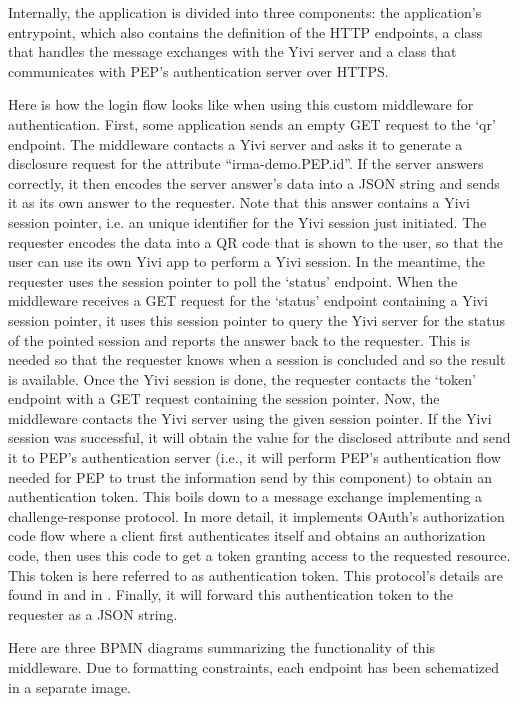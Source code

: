 \documentclass{report}
\begin{document}
Internally, the application is divided into three components: the application's entrypoint, which also contains the definition of the HTTP endpoints, a class that handles the
message exchanges with the Yivi server and a class that communicates with PEP's authentication server over HTTPS. \par
Here is how the login flow looks like when using this custom middleware for authentication. First, some application sends an empty GET request to the \enquote*{qr} endpoint. The
middleware contacts a Yivi server and asks it to generate a disclosure request for the attribute \enquote{irma-demo.PEP.id}. If the server answers
correctly, it then encodes the server answer's data into a JSON string and sends it as its own answer to the requester. Note that this answer contains a Yivi session pointer, i.e.
an unique identifier for the Yivi session just initiated. The requester encodes the data into a QR code that is shown to the user, so that the user can use its own Yivi app to
perform a Yivi session. In the meantime, the requester uses the session pointer to poll the \enquote*{status} endpoint. When the middleware receives a GET request for the
\enquote*{status} endpoint containing a Yivi session pointer, it uses this session pointer to query the Yivi server for the status of the pointed session and reports the answer
back to the requester. This is needed so that the requester knows when a session is concluded and so the result is available. Once the Yivi session is done, the requester contacts
the \enquote*{token} endpoint with a GET request containing the session pointer. Now, the middleware contacts the Yivi server using the given session pointer. If the Yivi session
was successful, it will obtain the value for the disclosed attribute and send it to PEP's authentication server (i.e., it will perform PEP's authentication flow needed for PEP to trust 
the information send by this component) to obtain an authentication token. This boils down to a message exchange implementing a challenge-response protocol. In more detail, it
implements OAuth's authorization code flow where a client first authenticates itself and obtains an authorization code, then uses this code to get a token
granting access to the requested resource. This token is here referred to as authentication token. This protocol's details are found in \cite{oauth-authorization-code-grant-flow}
and in \cite{oauth-code-verifier-flow}. Finally, it will forward this authentication token to the requester as a JSON string. \par
Here are three BPMN diagrams summarizing the functionality of this middleware. Due to formatting constraints, each endpoint has been schematized in a separate image.
\end{document}
